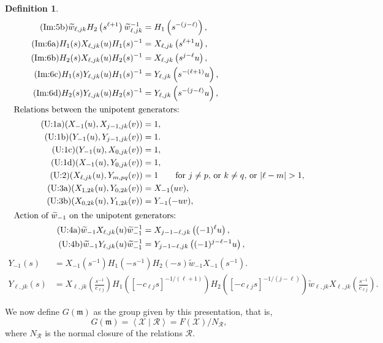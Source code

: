 \documentclass[11pt,letterpaper]{amsart}
\newcounter{thecounter}
\numberwithin{thecounter}{section}
\theoremstyle{definition}
\newtheorem{defn}[thecounter]{Definition}
\begin{document}
\begin{defn}
\begin{align*}
\tag{Im:5b}\label{G-wH2}
  \widetilde{w}_{\ell,jk} H_2\left(s^{\ell+1} \right) {\widetilde{w}_{\ell,jk}}^{-1}&=  H_1\left(s^{-(j-\ell)}\right),\\
\tag{Im:6a}\label{G-H1X}
  H_1(s) X_{\ell,jk}(u) H_1(s)^{-1}&=X_{\ell,jk}\left(s^{\ell+1}u \right),\\
\tag{Im:6b}\label{G-H2X}
  H_2(s) X_{\ell,jk}(u) H_2(s)^{-1}&=X_{\ell,jk}\left(s^{j-\ell}u \right),\\
\tag{Im:6c}\label{G-H1Y}
  H_1(s) Y_{\ell,jk}(u) H_1(s)^{-1}&=Y_{\ell,jk}\left(s^{-(\ell+1)}u \right),\\
\tag{Im:6d}\label{G-H2Y}
  H_2(s) Y_{\ell,jk}(u) H_2(s)^{-1}&=Y_{\ell,jk}\left(s^{-(j-\ell)}u \right),\\
\intertext{Relations between the unipotent generators:}
\tag{U:1a}\label{G-X-1X}
  (X_{-1}(u), X_{j-1,jk}(v))&=1,\\
\tag{U:1b}\label{G-Y-1Y} 
  (Y_{-1}(u), Y_{j-1,jk}(v))&=1.\\
\tag{U:1c}\label{G-Y-1X}
  (Y_{-1}(u), X_{0,jk}(v))&=1,\\
\tag{U:1d}\label{G-X-1Y}
  (X_{-1}(u), Y_{0,jk}(v))&=1,\\
\tag{U:2}\label{G-XYcomm}
  (X_{\ell,jk}(u), Y_{m,pq}(v))&=1\qquad\text{for $j\neq p$, or $k\neq q$, or $|\ell-m|>1$,}\\
\tag{U:3a}\label{G-XYj=2a} (X_{1,2k}(u),Y_{0,2k}(v))&=X_{-1}(uv),\\
\tag{U:3b}\label{G-XYj=2b}(X_{0,2k}(u),Y_{1,2k}(v))&=Y_{-1}(-uv),\\
\intertext{Action of $\widetilde{w}_{-1}$ on the unipotent generators:}
\tag{U:4a}\label{G-w-X}
  \widetilde{w}_{-1}X_{\ell,jk}(u)\widetilde{w}_{-1}^{-1}&=X_{j-1-\ell,jk}\left((-1)^{\ell} u \right), \\
\tag{U:4b}\label{G-w-Y}
  \widetilde{w}_{-1}Y_{\ell,jk}(u)\widetilde{w}_{-1}^{-1}&=Y_{j-1-\ell,jk}\left((-1)^{j-\ell-1} u \right), 
\end{align*}
\begin{align*} 
\tag{U:5a}\label{GL2-G-Yelim}
 Y_{-1}(s)& =X_{-1}\left(s^{-1} \right)H_1 \left(-s^{-1} \right)H_2 \left(-s \right)\widetilde{w}_{-1}X_{-1} \left(s^{-1} \right).\\
\tag{U:5b}\label{G-Yelim}
Y_{\ell,jk}(s) &=
X_{\ell,jk}\left(\frac{ s^{-1}}{c_{\ell j}}\right)
H_1\left(\left[-{{c_{\ell j}}}s\right]^{-1/(\ell+1)}\right)
H_2\left(\left[-{{c_{\ell j}}}s\right]^{-1/(j-\ell)}\right)\widetilde{w}_{\ell,jk}X_{\ell,jk}\left(\frac{ s^{-1}}{c_{\ell j}}\right).
\end{align*}

\endgroup



We now define $G(\mathfrak{m})$ as the group given by this presentation, that is,
$${G}(\mathfrak{m})= \left\langle \mathcal{X}\mid \mathcal{R}\right\rangle={F}(\mathcal{X})/N_\mathcal{R},$$
where $N_\mathcal{R}$ is the normal closure of the relations $\mathcal{R}$.
\end{defn}
\end{document}
